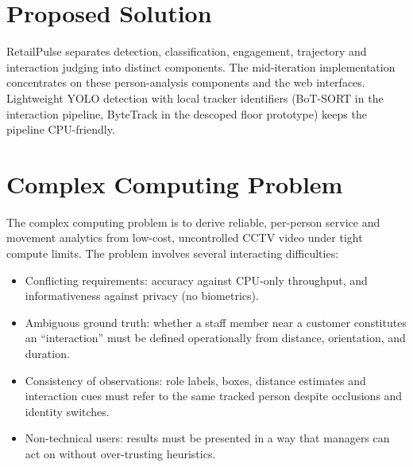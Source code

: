 \section{Proposed Solution}
RetailPulse separates detection, classification, engagement, trajectory and interaction judging into distinct components. The mid-iteration implementation concentrates on these person-analysis components and the web interfaces. Lightweight YOLO detection with local tracker identifiers (BoT-SORT in the interaction pipeline, ByteTrack in the descoped floor prototype) keeps the pipeline CPU-friendly.

\section{Complex Computing Problem}
The complex computing problem is to derive reliable, per-person service and movement analytics from low-cost, uncontrolled CCTV video under tight compute limits. The problem involves several interacting difficulties:
\begin{itemize}
\item Conflicting requirements: accuracy against CPU-only throughput, and informativeness against privacy (no biometrics).
\item Ambiguous ground truth: whether a staff member near a customer constitutes an ``interaction'' must be defined operationally from distance, orientation, and duration.
\item Consistency of observations: role labels, boxes, distance estimates and interaction cues must refer to the same tracked person despite occlusions and identity switches.
\item Non-technical users: results must be presented in a way that managers can act on without over-trusting heuristics.
\end{itemize}

